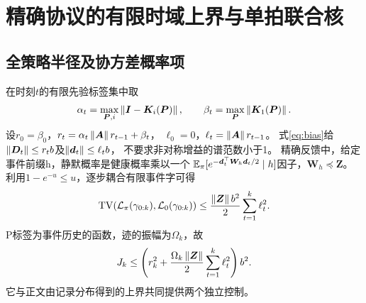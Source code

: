 \section{精确协议的有限时域上界与单拍联合核}
\label{app:single}
\subsection{全策略半径及协方差概率项}
在时刻$t$的有限先验标签集中取
\[
\alpha_t=\max_{{\bm{P}},i}\left\|{\bm{I}}-{\bm{K}}_i({\bm{P}})\right\|,\qquad \beta_t=\max_{\bm{P}}\left\|{\bm{K}}_1({\bm{P}})\right\|.
\]
设$r_0=\beta_0$，$r_t=\alpha_t\left\|\bm{A}\right\| r_{t-1}+\beta_t$，
$\ell_0=0$，$\ell_t=\left\|\bm{A}\right\| r_{t-1}$。
式\eqref{eq:bias}给$\left\|{\bm{D}}_t\right\|\le r_tb$及$\left\|{\bm{d}}_t\right\|\le\ell_tb$，
不要求非对称增益的谱范数小于1。
精确反馈中，给定事件前缀h，静默概率是健康概率乘以一个
$\mathbb E_\pi[e^{-{\bm{d}}_t^\top {\bm{W}}_h{\bm{d}}_t/2}\mid h]$因子，${\bm{W}}_h\preceq {\bm{Z}}$。
利用$1-e^{-u}\le u$，逐步耦合有限事件字可得
\[
\operatorname{TV}(\mathcal L_\pi(\gamma_{0:k}),\mathcal L_0(\gamma_{0:k}))
\le\frac{\left\|\bm{Z}\right\| b^2}{2}\sum_{t=1}^k\ell_t^2.
\]
P标签为事件历史的函数，迹的振幅为$\Omega_k$，故
\[
J_k\le
\left(r_k^2+\frac{\Omega_k\left\|\bm{Z}\right\|}{2}\sum_{t=1}^k\ell_t^2\right)b^2.
\]
它与正文由记录分布得到的上界共同提供两个独立控制。

